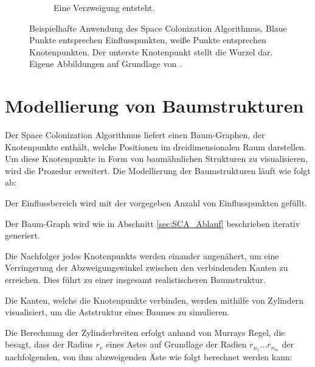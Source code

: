 \begin{figure} [hbtp]
\begin{subfigure}[t]{.3\textwidth}
		\caption{Eine Verzweigung entsteht.}
		\label{subfig:SCA_Basic8}
	\end{subfigure}
	\caption{Beispielhafte Anwendung des Space Colonization Algorithmus. Blaue Punkte entsprechen Einflusspunkten, weiße Punkte entsprechen Knotenpunkten. Der unterste Knotenpunkt stellt die Wurzel dar. Eigene Abbildungen auf Grundlage von \cite[Abb. 2]{SpaceColonizationAlgorithm:07}.}\label{fig:SCA_Basic}
	
\end{figure}


\section{Modellierung von Baumstrukturen}
\label{sec:ModellierungBaumstrukturen}
Der Space Colonization Algorithmus liefert einen Baum-Graphen, der Knotenpunkte enthält, welche Positionen im dreidimensionalen Raum darstellen. Um diese Knotenpunkte in Form von baumähnlichen Strukturen zu visualisieren, wird die Prozedur erweitert. Die Modellierung der Baumstrukturen läuft wie folgt ab:

\begin{description}[labelindent]
	\item[\boldmath$1.$] Der Einflussbereich wird mit der vorgegeben Anzahl von Einflusspunkten gefüllt. \cite[Abschn. 2]{SpaceColonizationAlgorithm:07} \\

	\item[\boldmath$2.$] Der Baum-Graph wird wie in Abschnitt \ref{sec:SCA_Ablauf} beschrieben iterativ generiert. \cite[Abschn. 2]{SpaceColonizationAlgorithm:07} \\

	\item[\boldmath$3.$] Die Nachfolger jedes Knotenpunkts werden einander angenähert, um eine Verringerung der Abzweigungswinkel zwischen den verbindenden Kanten zu erreichen. Dies führt zu einer insgesamt realistischeren Baumstruktur. \cite[Abschn. 2]{SpaceColonizationAlgorithm:07} \\
	
	\item[\boldmath$4.$] Die Kanten, welche die Knotenpunkte verbinden, werden mithilfe von Zylindern visualisiert, um die Aststruktur eines Baumes zu simulieren. \cite[Abschn. 2]{SpaceColonizationAlgorithm:07} 
	
\end{description}

Die Berechnung der Zylinderbreiten erfolgt anhand von Murrays Regel, die besagt, dass der Radius $r_v$ eines Astes auf Grundlage der Radien $r_{n_1}...r_{n_m}$ der nachfolgenden, von ihm abzweigenden Äste wie folgt berechnet werden kann: 

